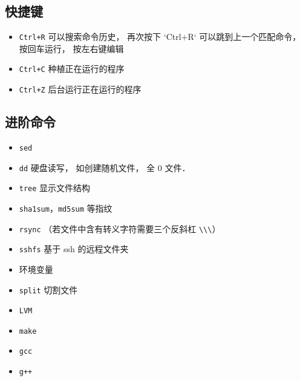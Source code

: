\subsection{快捷键}
\begin{itemize}
\item \verb|Ctrl+R| 可以搜索命令历史， 再次按下 `Ctrl+R` 可以跳到上一个匹配命令， 按回车运行， 按左右键编辑
\item \verb|Ctrl+C| 种植正在运行的程序
\item \verb|Ctrl+Z| 后台运行正在运行的程序
\end{itemize}

\subsection{进阶命令}
\begin{itemize}
\item \verb|sed|
\item \verb|dd| 硬盘读写， 如创建随机文件， 全 0 文件．
\item \verb|tree| 显示文件结构
\item \verb|sha1sum|，\verb|md5sum| 等指纹
\item \verb|rsync| （若文件中含有转义字符需要三个反斜杠 \verb|\\\|）
\item \verb|sshfs| 基于 ssh 的远程文件夹
\item 环境变量
\item \verb|split| 切割文件
\item \verb|LVM|
\item \verb|make|
\item \verb|gcc|
\item \verb|g++|
\end{itemize}
